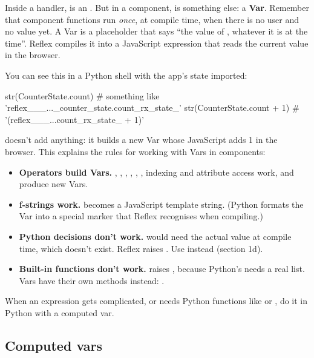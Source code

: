 Inside a handler,  is an . But in a component,  is something else: a \textbf{Var}. Remember that component functions run \emph{once}, at compile time, when there is no user and no value yet. A Var is a placeholder that says ``the value of , whatever it is at the time''. Reflex compiles it into a JavaScript expression that reads the current value in the browser.

You can see this in a Python shell with the app's state imported:

\begin{py}
str(CounterState.count)        # something like 'reflex___..._counter_state.count_rx_state_'
str(CounterState.count + 1)    # '(reflex___...count_rx_state_ + 1)'
\end{py}

 doesn't add anything: it builds a new Var whose JavaScript adds 1 in the browser. This explains the rules for working with Vars in components:

\begin{itemize}
\item \textbf{Operators build Vars.} \cd{+}, \cd{-}, \cd{*}, \cd{/}, \cd{==}, \cd{>}, indexing \cd{[i]} and attribute access work, and produce new Vars.
\item \textbf{f-strings work.}  becomes a JavaScript template string. (Python formats the Var into a special marker that Reflex recognises when compiling.)
\item \textbf{Python decisions don't work.}  would need the actual value at compile time, which doesn't exist. Reflex raises . Use  instead (section 1d).
\item \textbf{Built-in functions don't work.}  raises , because Python's  needs a real list. Vars have their own methods instead: .
\end{itemize}

When an expression gets complicated, or needs Python functions like  or , do it in Python with a computed var.

\subsection{Computed vars}

